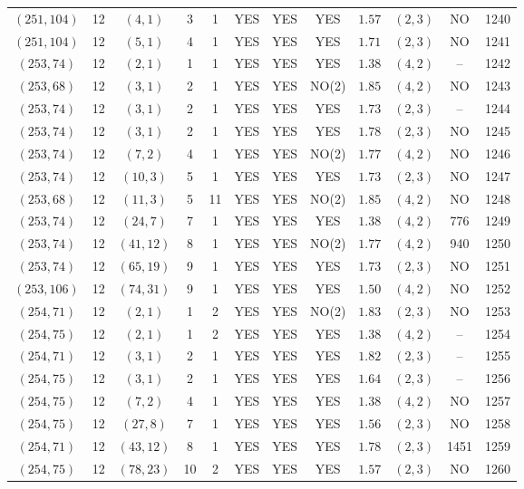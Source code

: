 \begin{longtable}{|c|c|c|c|c|c|c|c|c|c|c|c|}
$(251,104)$ & 12 & $(4,1)$ & 3 & 1 & YES & YES & YES & $1.57$ & $(2,3)$ & NO & 1240\\
$(251,104)$ & 12 & $(5,1)$ & 4 & 1 & YES & YES & YES & $1.71$ & $(2,3)$ & NO & 1241\\
$(253,74)$ & 12 & $(2,1)$ & 1 & 1 & YES & YES & YES & $1.38$ & $(4,2)$ & -- & 1242\\
$(253,68)$ & 12 & $(3,1)$ & 2 & 1 & YES & YES & NO(2) & $1.85$ & $(4,2)$ & NO & 1243\\
$(253,74)$ & 12 & $(3,1)$ & 2 & 1 & YES & YES & YES & $1.73$ & $(2,3)$ & -- & 1244\\
$(253,74)$ & 12 & $(3,1)$ & 2 & 1 & YES & YES & YES & $1.78$ & $(2,3)$ & NO & 1245\\
$(253,74)$ & 12 & $(7,2)$ & 4 & 1 & YES & YES & NO(2) & $1.77$ & $(4,2)$ & NO & 1246\\
$(253,74)$ & 12 & $(10,3)$ & 5 & 1 & YES & YES & YES & $1.73$ & $(2,3)$ & NO & 1247\\
$(253,68)$ & 12 & $(11,3)$ & 5 & 11 & YES & YES & NO(2) & $1.85$ & $(4,2)$ & NO & 1248\\
$(253,74)$ & 12 & $(24,7)$ & 7 & 1 & YES & YES & YES & $1.38$ & $(4,2)$ & 776 & 1249\\
$(253,74)$ & 12 & $(41,12)$ & 8 & 1 & YES & YES & NO(2) & $1.77$ & $(4,2)$ & 940 & 1250\\
$(253,74)$ & 12 & $(65,19)$ & 9 & 1 & YES & YES & YES & $1.73$ & $(2,3)$ & NO & 1251\\
$(253,106)$ & 12 & $(74,31)$ & 9 & 1 & YES & YES & YES & $1.50$ & $(4,2)$ & NO & 1252\\
$(254,71)$ & 12 & $(2,1)$ & 1 & 2 & YES & YES & NO(2) & $1.83$ & $(2,3)$ & NO & 1253\\
$(254,75)$ & 12 & $(2,1)$ & 1 & 2 & YES & YES & YES & $1.38$ & $(4,2)$ & -- & 1254\\
$(254,71)$ & 12 & $(3,1)$ & 2 & 1 & YES & YES & YES & $1.82$ & $(2,3)$ & -- & 1255\\
$(254,75)$ & 12 & $(3,1)$ & 2 & 1 & YES & YES & YES & $1.64$ & $(2,3)$ & -- & 1256\\
$(254,75)$ & 12 & $(7,2)$ & 4 & 1 & YES & YES & YES & $1.38$ & $(4,2)$ & NO & 1257\\
$(254,75)$ & 12 & $(27,8)$ & 7 & 1 & YES & YES & YES & $1.56$ & $(2,3)$ & NO & 1258\\
$(254,71)$ & 12 & $(43,12)$ & 8 & 1 & YES & YES & YES & $1.78$ & $(2,3)$ & 1451 & 1259\\
$(254,75)$ & 12 & $(78,23)$ & 10 & 2 & YES & YES & YES & $1.57$ & $(2,3)$ & NO & 1260\\

\end{longtable}
